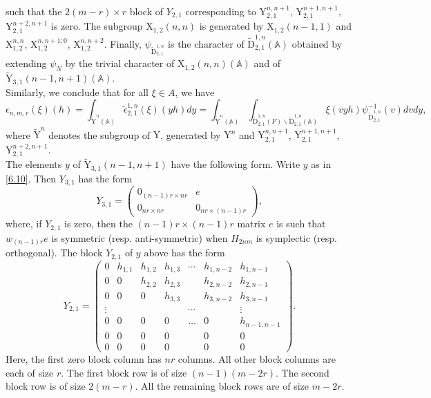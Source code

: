 \documentclass[12pts]{amsart}
\newcommand{\BA}{{\mathbb {A}}}
\begin{document}
such that the $2(m-r)\times r$ block of $Y_{2,1}$ corresponding to 
$\mathrm{Y}_{2,1}^{n,n+1}$, $\mathrm{Y}_{2,1}^{n+1,n+1}$, $\mathrm{Y}_{2,1}^{n+2,n+1}$ is zero. The subgroup $\mathrm{X}_{1,2}(n,n)$ is
generated by $\mathrm{X}_{1,2}(n-1,1)$ and
$\mathrm{X}_{1,2}^{n,n}$, $\mathrm{X}_{1,2}^{n,n+1;0}$, $\mathrm{X}_{1,2}^{n,n+2}$. Finally,
$\psi_{\widetilde{\mathrm{D}}_{2,1}^{1,n}}$ is the character of
$\widetilde{\mathrm{D}}_{2,1}^{1,n}(\BA)$ obtained by extending
$\psi_N$ by the trivial character of $\mathrm{X}_{1,2}(n,n)(\BA)$
and of $\widetilde{\mathrm{Y}}_{3,1}(n-1,n+1)({\BA})$.\\
Similarly, we conclude that for all $\xi\in A$, we have
\begin{equation}\label{7.2'}
\epsilon_{n,m,r}(\xi)(h)=\int_{\widetilde{\mathrm{Y}}^n(\BA)}\tilde{\epsilon}_{2,1}^{1,n}(\xi)(yh)dy
=\int_{\widetilde{\mathrm{Y}}^n(\BA)}\int_{\widetilde{\mathrm{D}}_{2,1}^{1,n}(F)\backslash \widetilde{\mathrm{D}}_{2,1}^{1,n}(\BA)}\xi(vyh)\psi^{-1}_{\widetilde{\mathrm{D}}_{2,1}^{1,n}}(v)dvdy,
\end{equation}
where $\widetilde{\mathrm{Y}}^n$ denotes the subgroup of $\mathrm{Y}$, generated by $\mathrm{Y}^n$ and $\mathrm{Y}_{2,1}^{n,n+1}$, $\mathrm{Y}_{2,1}^{n+1,n+1}$, $\mathrm{Y}_{2,1}^{n+2,n+1}$.\\
The elements $y$ of $\widetilde{\mathrm{Y}}_{3,1}(n-1,n+1)$ have the
following form. Write $y$ as in \eqref{6.10}. Then $Y_{3,1}$ has the
form
\begin{equation}\label{7.4}
Y_{3,1}=\begin{pmatrix}0_{(n-1)r\times nr}&e\\0_{nr\times
	nr}&0_{nr\times (n-1)r}\end{pmatrix},
\end{equation}
where, if $Y_{2,1}$ is zero, then the $(n-1)r\times (n-1)r$ matrix
$e$ is such that $ w_{(n-1)r}e$ is symmetric (resp. anti-symmetric) when $H_{2nm}$ is symplectic (resp. orthogonal). The block $Y_{2,1}$ of $y$ above has the form
\begin{equation}\label{7.5}
Y_{2,1}=\begin{pmatrix}0&h_{1,1}&h_{1,2}&h_{1,3}&\cdots&h_{1,n-2}&h_{1,n-1}\\
0&0&h_{2,2}&h_{2,3}&&h_{2,n-2}&h_{2,n-1}\\0&0&0&h_{3,3}&&h_{3,n-2}&h_{3,n-1}\\
\vdots&&&&\cdots&&\vdots\\ 0&0&0&0&\dots& 0&h_{n-1,n-1}\\0&0&0&0&& 0&0\\0&0&0&0&& 0&0\end{pmatrix}.
\end{equation}
Here, the first zero block column has $nr$ columns. All other block columns are each of size $r$. The first block row is of size $(n-1)(m-2r)$. The second block row is of size $2(m-r)$. All the remaining block rows are of size $m-2r$.
\end{document}
